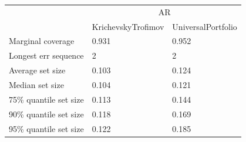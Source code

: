 \begin{tabular}{lll}
\toprule
& \multicolumn{2}{c}{AR} \\
& KrichevskyTrofimov & UniversalPortfolio \\
\midrule
Marginal coverage & 0.931 & 0.952 \\
Longest err sequence & 2 & 2 \\
Average set size & 0.103 & 0.124 \\
Median set size & 0.104 & 0.121 \\
75\% quantile set size & 0.113 & 0.144 \\
90\% quantile set size & 0.118 & 0.169 \\
95\% quantile set size & 0.122 & 0.185 \\
\bottomrule
\end{tabular}
